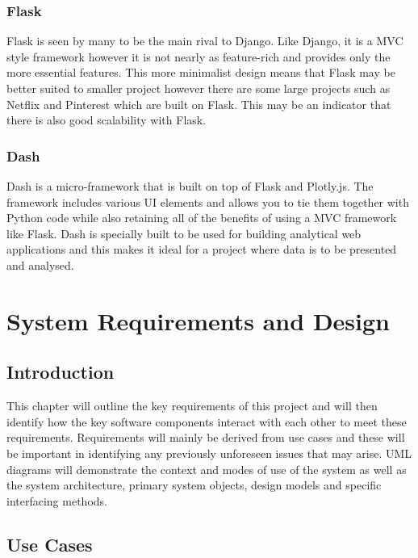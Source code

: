 \documentclass[10pt,a4paper]{article}
\begin{document}
\subsubsection{Flask}
Flask\cite{website:flask} is seen by many to be the main rival to Django. Like Django, it is a MVC style framework however it is not nearly as feature-rich and provides only the more essential features. This more minimalist design means that Flask may be better suited to smaller project however there are some large projects such as Netflix and Pinterest which are built on Flask. This may be an indicator that there is also good scalability with Flask. 
\subsubsection{Dash}
Dash\cite{website:dash} is a micro-framework that is built on top of Flask and Plotly.js. The framework includes various UI elements and allows you to tie them together with Python code while also retaining all of the benefits of using a MVC framework like Flask. Dash is specially built to be used for building analytical web applications and this makes it ideal for a project where data is to be presented and analysed. 

\pagebreak
\section{System Requirements and Design}
\subsection{Introduction}
This chapter will outline the key requirements of this project and will then identify how the key software components interact with each other to meet these requirements. Requirements will mainly be derived from use cases and these will be important in identifying any previously unforeseen issues that may arise. UML diagrams will demonstrate the context and modes of use of the system as well as the system architecture, primary system objects, design models and specific interfacing methods. 

\subsection{Use Cases}
\end{document}
